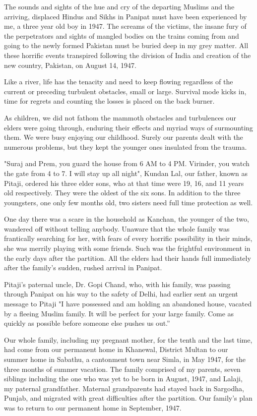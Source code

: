 The sounds and sights of the hue and cry of the departing Muslims and the
arriving, displaced Hindus and Sikhs in Panipat must have been experienced
by me, a three year old boy in 1947. The screams of the victims, the
insane fury of the perpetrators and sights of mangled bodies on the trains
coming from and going to the newly formed Pakistan must be buried deep in
my grey matter. All these horrific events transpired following the
division of India and creation of the new country, Pakistan, on August 14,
1947. 

Like a river, life has the tenacity and need to keep flowing regardless of
the current or preceding turbulent obstacles, small or large. Survival
mode kicks in, time for regrets and counting the losses is placed on the
back burner. 

As children, we did not fathom the mammoth obstacles and turbulences our
elders were going through, enduring their effects and myriad ways of
surmounting them. We were busy enjoying our childhood. Surely our parents
dealt with the numerous problems, but they kept the younger ones insulated
from the trauma. 

"Suraj and Prem, you guard the house from 6 AM to 4 PM. Virinder, you
watch the gate from 4 to 7. I will stay up all night", Kundan Lal, our
father, known as Pitaji, ordered his three elder sons, who at that time
were 19, 16, and 11 years old respectively. They were the oldest of the
six sons. In addition to the three youngsters, one only few months old,
two sisters need full time protection as well.

One day there was a scare in the household as Kanchan, the younger of the
two, wandered off without telling anybody. Unaware that the whole family
was frantically searching for her, with fears of every horrific
possibility in their minds, she was merrily playing with some friends.
Such was the frightful environment in the early days after the partition.
All the elders had their hands full immediately after the family's sudden,
rushed arrival in Panipat. 

Pitaji's paternal uncle, Dr. Gopi Chand, who, with his family, was passing
through Panipat on his way to the safety of Delhi, had earlier sent an
urgent message to Pitaji "I have possessed and am holding an abandoned
house, vacated by a fleeing Muslim family. It will be perfect for your
large family. Come as quickly as possible before someone else pushes us
out.”

Our whole family, including my pregnant mother, for the tenth and the last
time, had come from our permanent home in Khanewal, District Multan to our
summer home in Sabathu, a cantonment town near Simla, in May 1947, for the
three months of summer vacation. The family comprised of my parents, seven
siblings including the one who was yet to be born in August, 1947, and
Lalaji, my paternal grandfather. Maternal grandparents had stayed back in
Sargodha, Punjab, and migrated with great difficulties after the
partition. Our family's plan was to return to our permanent home in
September, 1947. 

